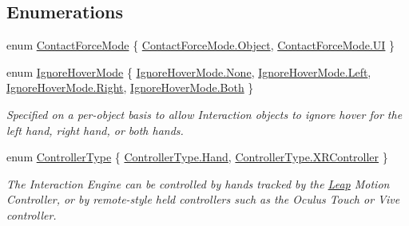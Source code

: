 \subsection*{Enumerations}
\begin{DoxyCompactItemize}
\item 
enum \mbox{\hyperlink{namespace_leap_1_1_unity_1_1_interaction_a7a6c3499f7b7d02b0d389e8ac72a315f}{Contact\+Force\+Mode}} \{ \mbox{\hyperlink{namespace_leap_1_1_unity_1_1_interaction_a7a6c3499f7b7d02b0d389e8ac72a315fa497031794414a552435f90151ac3b54b}{Contact\+Force\+Mode.\+Object}}, 
\mbox{\hyperlink{namespace_leap_1_1_unity_1_1_interaction_a7a6c3499f7b7d02b0d389e8ac72a315fa71ff71526d15db86eb50fcac245d183b}{Contact\+Force\+Mode.\+UI}}
 \}
\item 
enum \mbox{\hyperlink{namespace_leap_1_1_unity_1_1_interaction_aba04c439c84829d617115cfd977cb11b}{Ignore\+Hover\+Mode}} \{ \mbox{\hyperlink{namespace_leap_1_1_unity_1_1_interaction_aba04c439c84829d617115cfd977cb11ba6adf97f83acf6453d4a6a4b1070f3754}{Ignore\+Hover\+Mode.\+None}}, 
\mbox{\hyperlink{namespace_leap_1_1_unity_1_1_interaction_aba04c439c84829d617115cfd977cb11ba945d5e233cf7d6240f6b783b36a374ff}{Ignore\+Hover\+Mode.\+Left}}, 
\mbox{\hyperlink{namespace_leap_1_1_unity_1_1_interaction_aba04c439c84829d617115cfd977cb11ba92b09c7c48c520c3c55e497875da437c}{Ignore\+Hover\+Mode.\+Right}}, 
\mbox{\hyperlink{namespace_leap_1_1_unity_1_1_interaction_aba04c439c84829d617115cfd977cb11ba130c5b3473c57faa76e2a1c54e26f88e}{Ignore\+Hover\+Mode.\+Both}}
 \}
\begin{DoxyCompactList}\small\item\em Specified on a per-\/object basis to allow Interaction objects to ignore hover for the left hand, right hand, or both hands. \end{DoxyCompactList}\item 
enum \mbox{\hyperlink{namespace_leap_1_1_unity_1_1_interaction_a9752eb3e2905e8ebd134fff20c155e6b}{Controller\+Type}} \{ \mbox{\hyperlink{namespace_leap_1_1_unity_1_1_interaction_a9752eb3e2905e8ebd134fff20c155e6baa78b1ac16c0cd02168097fc9a9bd7604}{Controller\+Type.\+Hand}}, 
\mbox{\hyperlink{namespace_leap_1_1_unity_1_1_interaction_a9752eb3e2905e8ebd134fff20c155e6ba6ecc9ec5b0bb5f525f4d0e14e8b77382}{Controller\+Type.\+X\+R\+Controller}}
 \}
\begin{DoxyCompactList}\small\item\em The Interaction Engine can be controlled by hands tracked by the \mbox{\hyperlink{namespace_leap}{Leap}} Motion Controller, or by remote-\/style held controllers such as the Oculus Touch or Vive controller. \end{DoxyCompactList}\item 

\end{DoxyCompactItemize}
